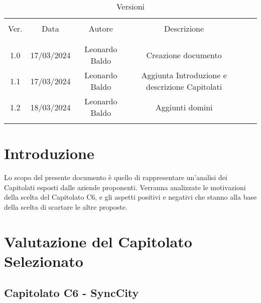 \documentclass[italian,12pt]{article} %
\begin{document}


\newpage



\begin{table}[!h]
	\caption{Versioni}
	\begin{center}
		\begin{tabular}{ c c c c c c }
			\hline \\[-2ex]
			Ver. & Data & Autore & Descrizione \\
			\\[-2ex] \hline \\[-1.5ex]
			1.0  & 17/03/2024 & Leonardo Baldo & Creazione documento \\
			1.1 & 17/03/2024 & Leonardo Baldo & Aggiunta Introduzione e descrizione Capitolati \\
			1.2 & 18/03/2024 & Leonardo Baldo & Aggiunti domini \\

			\\[-1.5ex] \hline
		\end{tabular}
	\end{center}
\end{table}

\newpage

\tableofcontents

\newpage

\section{Introduzione}
Lo scopo del presente documento è quello di rappresentare un'analisi dei Capitolati esposti dalle aziende proponenti. Verranna analizzate le motivazioni della scelta del Capitolato C6, e gli aspetti positivi e negativi che stanno alla base della scelta di scartare le altre proposte.



\section{Valutazione del Capitolato Selezionato}

\subsection{Capitolato C6 - SyncCity}
\end{document}
